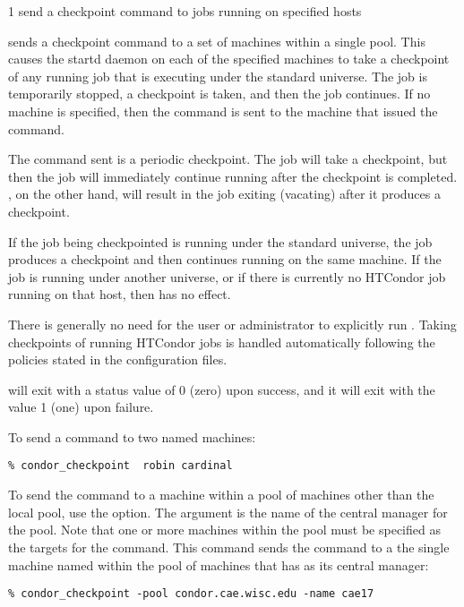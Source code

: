 \begin{ManPage}{\label{man-condor-checkpoint}}{1}
{send a checkpoint command to jobs running on specified hosts}

\Synopsis {}
\ToolArgsBase

\ToolDebugOption
\ToolWhere

\Description
{} sends a checkpoint command to a set
of machines within a single pool.
This causes the startd daemon on each of the specified machines
to take a checkpoint of any running job that is executing under
the standard universe.
The job is temporarily stopped, a checkpoint is taken,
and then the job continues.
If no machine is specified, then the command
is sent to the machine that issued the
 command.

The command sent is a periodic checkpoint.
The job will take a checkpoint, but then the job will immediately
continue running after the checkpoint is completed.
, on the other hand, will result in the job exiting
(vacating) after it produces a checkpoint. 

If the job being checkpointed is running under the standard universe,
the job produces a checkpoint and then continues running
on the same machine.
If the job is running under another universe,
or if there is currently no HTCondor job
running on that host, then  has no effect. 

There is generally no need for the user or administrator to explicitly
run .
Taking checkpoints of running HTCondor jobs is
handled automatically following the policies
stated in the configuration files. 

\begin{Options}
	\ToolArgsBaseDesc
	\ToolDebugDesc
	\ToolArgsLocateDesc
\end{Options}

\ExitStatus

 will exit with a status value of 0 (zero) upon success,
and it will exit with the value 1 (one) upon failure.

\Examples
To send a  command to two named machines:
\begin{verbatim}
% condor_checkpoint  robin cardinal
\end{verbatim}

To send the  command to a machine
within a pool of machines other than the local pool,
use the  option.
The argument is the name of the central manager for the pool.
Note that one or more machines within the pool must be
specified as the targets for the command.
This command sends the command to
a the single machine named  within the
pool of machines that has  as
its central manager:
\begin{verbatim}
% condor_checkpoint -pool condor.cae.wisc.edu -name cae17
\end{verbatim}

\end{ManPage}
